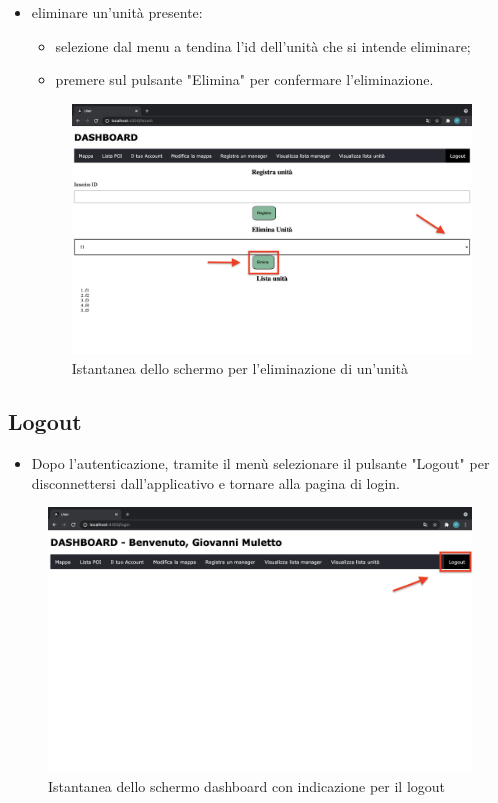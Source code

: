 \begin{itemize}
\begin{figure}[H]
    \end{figure}
    \item eliminare un'unità presente: 
    \begin{itemize}
        \item selezione dal menu a tendina l'id dell'unità che si intende eliminare;
        \item premere sul pulsante "Elimina" per confermare l'eliminazione.
    \end{itemize}
    \begin{figure}[H]
        \centering
        \includegraphics[scale=0.12]{res/images/eliminaunita.png}
        \caption{Istantanea dello schermo per l'eliminazione di un'unità}
    \end{figure}
\end{itemize}

\subsection{Logout}
\begin{itemize}
    \item Dopo l'autenticazione, tramite il menù selezionare il pulsante "Logout" per disconnettersi dall'applicativo e tornare alla pagina di login.
\end{itemize}
\begin{figure}[H]
    \centering
    \includegraphics[scale=0.12]{res/images/logout.png}
    \caption{Istantanea dello schermo dashboard con indicazione per il logout}
\end{figure} 
